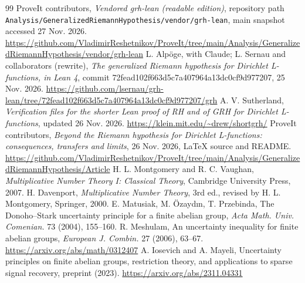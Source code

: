 \documentclass[11pt]{article}
\theoremstyle{definition}\newtheorem{remark}[theorem]{Remark}
\begin{document}
\begin{thebibliography}{99}
 ProveIt contributors, \emph{Vendored grh-lean (readable edition)}, repository path \texttt{Analysis/GeneralizedRiemannHypothesis/vendor/grh-lean}, main snapshot accessed 27 Nov. 2026. \url{https://github.com/VladimirReshetnikov/ProveIt/tree/main/Analysis/GeneralizedRiemannHypothesis/vendor/grh-lean}
 L. Alp\"oge, with Claude; L. Sernau and collaborators (rewrite), \emph{The generalized Riemann hypothesis for Dirichlet L-functions, in Lean 4}, commit 72fead102f663d5c7a407964a13dc0cf9d977207, 25 Nov. 2026. \url{https://github.com/lsernau/grh-lean/tree/72fead102f663d5c7a407964a13dc0cf9d977207/grh}
 A. V. Sutherland, \emph{Verification files for the shorter Lean proof of RH and of GRH for Dirichlet L-functions}, updated 26 Nov. 2026. \url{https://klein.mit.edu/~drew/shortgrh/}
 ProveIt contributors, \emph{Beyond the Riemann hypothesis for Dirichlet L-functions: consequences, transfers and limits}, 26 Nov. 2026, LaTeX source and README. \url{https://github.com/VladimirReshetnikov/ProveIt/tree/main/Analysis/GeneralizedRiemannHypothesis/Article}
 H. L. Montgomery and R. C. Vaughan, \emph{Multiplicative Number Theory I: Classical Theory}, Cambridge University Press, 2007.
 H. Davenport, \emph{Multiplicative Number Theory}, 3rd ed., revised by H. L. Montgomery, Springer, 2000.
 E. Matusiak, M. \"Ozayd\i n, T. Przebinda, The Donoho--Stark uncertainty principle for a finite abelian group, \emph{Acta Math. Univ. Comenian.} 73 (2004), 155--160.
 R. Meshulam, An uncertainty inequality for finite abelian groups, \emph{European J. Combin.} 27 (2006), 63--67. \url{https://arxiv.org/abs/math/0312407}
 A. Iosevich and A. Mayeli, Uncertainty principles on finite abelian groups, restriction theory, and applications to sparse signal recovery, preprint (2023). \url{https://arxiv.org/abs/2311.04331}
\end{thebibliography}
\end{document}
